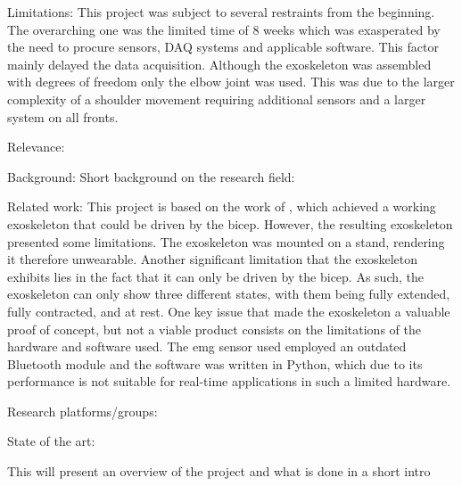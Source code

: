             Limitations:
                This project was subject to several restraints from the beginning. The overarching one was the limited time of 8 weeks which was
                exasperated by the need to procure sensors, DAQ systems and applicable software. This factor mainly delayed the data acquisition. 
                Although the exoskeleton was assembled with degrees of freedom only the elbow joint was used. This was due to the larger complexity 
                of a shoulder movement requiring additional sensors and a larger system on all fronts.
            
            Relevance: %


Background: 
    Short background on the research field:

    Related work: %
        This project is based on the work of \cite{AFES}, which achieved a working exoskeleton that could be driven by the bicep. However, the resulting 
        exoskeleton presented some limitations. The exoskeleton was mounted on a stand, rendering it therefore unwearable. Another significant limitation 
        that the exoskeleton exhibits lies in the fact that it can only be driven by the bicep. As such, the exoskeleton can only show three different states, 
        with them being fully extended, fully contracted, and at rest. One key issue that made the exoskeleton a valuable proof of concept, but not a viable 
        product consists on the limitations of the hardware and software used. The \acs{emg} sensor used employed an outdated Bluetooth module and the software was 
        written in Python, which due to its performance is not suitable for real-time applications in such a limited hardware.

    Research platforms/groups:

    State of the art:


    This will present an overview of the project and what is done in a short intro
